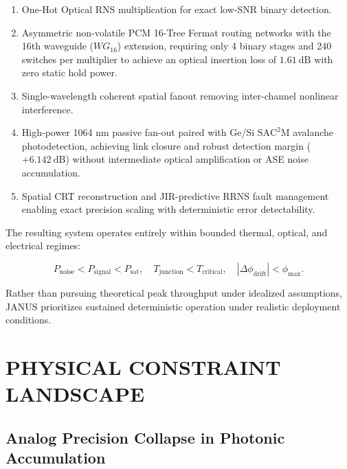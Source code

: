 \documentclass[journal]{IEEEtran}
\begin{document}
\begin{enumerate}
\item One-Hot Optical RNS multiplication for exact low-SNR binary detection.
\item Asymmetric non-volatile PCM 16-Tree Fermat routing networks with the 16th waveguide ($WG_{16}$) extension, requiring only 4 binary stages and 240 switches per multiplier to achieve an optical insertion loss of $1.61~\mathrm{dB}$ with zero static hold power.
\item Single-wavelength coherent spatial fanout removing inter-channel nonlinear interference.
\item High-power 1064 nm passive fan-out paired with Ge/Si $\mathrm{SAC^2M}$ avalanche photodetection, achieving link closure and robust detection margin ($+6.142~\mathrm{dB}$) without intermediate optical amplification or ASE noise accumulation.
\item Spatial CRT reconstruction and JIR-predictive RRNS fault management enabling exact precision scaling with deterministic error detectability.
\end{enumerate}

The resulting system operates entirely within bounded thermal, optical, and electrical regimes:

\begin{equation}
P_{\mathrm{noise}} < P_{\mathrm{signal}} < P_{\mathrm{sat}}, \quad T_{\mathrm{junction}} < T_{\mathrm{critical}}, \quad |\Delta\phi_{\mathrm{drift}}| < \phi_{\mathrm{max}}.
\end{equation}

Rather than pursuing theoretical peak throughput under idealized assumptions, JANUS prioritizes sustained deterministic operation under realistic deployment conditions.

\section{PHYSICAL CONSTRAINT LANDSCAPE}

\subsection{\textbf{Analog Precision Collapse in Photonic Accumulation}}
\label{sec:precision_collapse}
\end{document}
